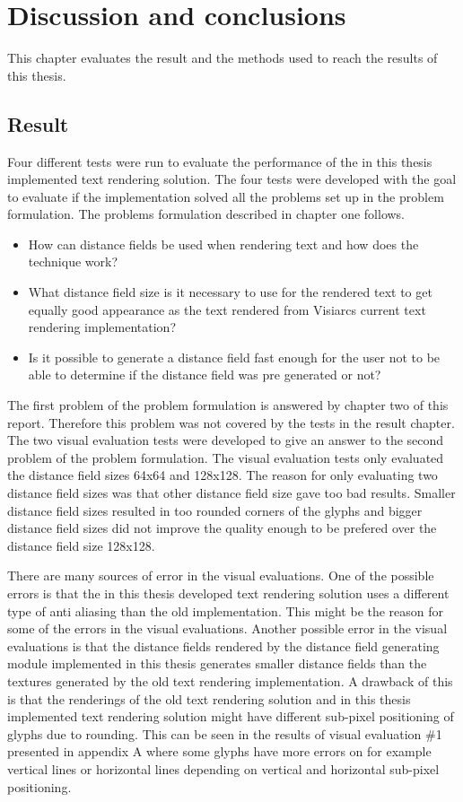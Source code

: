 \chapter{Discussion and conclusions}
This chapter evaluates the result and the methods used to reach the results of this thesis.
\section{Result}
Four different tests were run to evaluate the performance of the in this thesis implemented text rendering solution. The four tests were developed with the goal to evaluate if the implementation solved all the problems set up in the problem formulation. The problems formulation described in chapter one follows.
\begin{itemize}
  \item How can distance fields be used when rendering text and how does the technique work?
  \item What distance field size is it necessary to use for the rendered text to get equally good appearance as the text rendered from Visiarcs current text rendering implementation?
  \item Is it possible to generate a distance field fast enough for the user not to be able to determine if the distance field was pre generated or not?
\end{itemize} 
The first problem of the problem formulation is answered by chapter two of this report. Therefore this problem was not covered by the tests in the result chapter. The two visual evaluation tests were developed to give an answer to the second problem of the problem formulation. The visual evaluation tests only evaluated the distance field sizes 64x64 and 128x128. The reason for only evaluating two distance field sizes was that other distance field size gave too bad results. Smaller distance field sizes resulted in too rounded corners of the glyphs and bigger distance field sizes did not improve the quality enough to be prefered over the distance field size 128x128.

There are many sources of error in the visual evaluations. One of the possible errors is that the in this thesis developed text rendering solution uses a different type of anti aliasing than the old implementation. This might be the reason for some of the errors in the visual evaluations. Another possible error in the visual evaluations is that the distance fields rendered by the distance field generating module implemented in this thesis generates smaller distance fields than the textures generated by the old text rendering implementation. A drawback of this is that the renderings of the old text rendering solution and in this thesis implemented text rendering solution might have different sub-pixel positioning of glyphs due to rounding. This can be seen in the results of visual evaluation \#1 presented in appendix A where some glyphs have more errors on for example vertical lines or horizontal lines depending on vertical and horizontal sub-pixel positioning.

